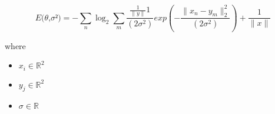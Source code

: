 \documentclass[12pt]{article}
\begin{document}
\[
\textit{E(θ,σ²)} = -\sum_\textit{n}  \log_2{ \sum_\textit{m} \frac{\frac{1}{\|\textit{y}\|}1}{(2\textit{σ}^{2})}exp(-\frac{\|\textit{x}_{ \textit{n} } - \textit{y}_{ \textit{m} }\|_2^{2}}{(2\textit{σ}^{2})}) + \frac{1}{\|\textit{x}\|} }
\]

where
\begin{itemize}
\item $\textit{x}_{\textit{i}} \in \mathbb{R}^{ 2}$
\item $\textit{y}_{\textit{j}} \in \mathbb{R}^{ 2}$
\item $\textit{σ} \in \mathbb{{R}}$
\end{itemize}
\end{document}
